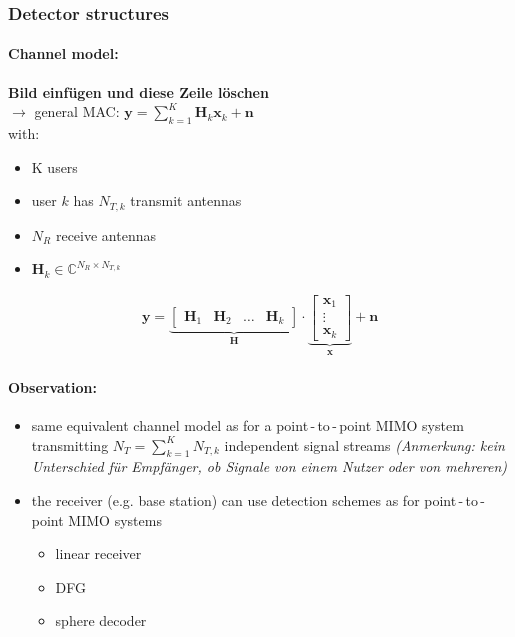 \documentclass[a4paper, 10pt]{article}
\begin{document}
\subsubsection{Detector structures}
\paragraph*{Channel model:}
\textbf{Bild einf\"ugen und diese Zeile l\"oschen}\\
$\rightarrow  $ general MAC: $\mathbf{y} = \sum\limits_{k = 1}^{K}\mathbf{H}_k\mathbf{x}_k + \mathbf{n} $\\
with: \begin{itemize}
	\item K users
	\item user $k $ has $N_{T,k} $ transmit antennas
	\item $N_R $ receive antennas
	\item $\mathbf{H}_k \in \mathbb{C}^{N_R\times N_{T,k}} $ 
\end{itemize}
\begin{align*}
	\mathbf{y} = 
	\underbrace{
	\begin{bmatrix}\mathbf{H}_1 & \mathbf{H}_2 & \ldots & \mathbf{H}_k 	
	\end{bmatrix}
	}_{\mathbf{H}}\cdot
	\underbrace{
	\begin{bmatrix}\mathbf{x}_1 \\ \vdots \\ \mathbf{x}_k		
	\end{bmatrix}}_{\mathbf{x}} + \mathbf{n}
\end{align*}
\paragraph*{Observation:}
\begin{itemize}
	\item same equivalent channel model as for a point\,-\,to\,-\,point MIMO system transmitting $N_T = \sum_{k = 1}^{K} N_{T,k} $ independent signal streams \quad \textit{(Anmerkung: kein Unterschied f\"ur Empf\"anger, ob Signale von einem Nutzer oder von mehreren)}
	\item the receiver (e.g. base station) can use detection schemes as for point\,-\,to\,-\,point MIMO systems
	\begin{itemize}
		\item linear receiver
		\item DFG
		\item sphere decoder
	\end{itemize}
\end{itemize}
\end{document}
